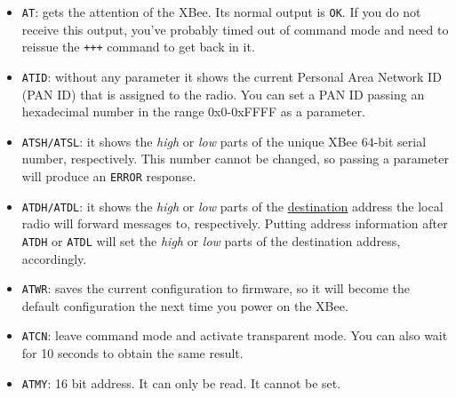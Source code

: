 \begin{itemize}
	\item \texttt{AT}: gets the attention of the XBee. Its normal output is \texttt{OK}. If you do not receive this output,  you've probably timed out of command mode and need to reissue the \texttt{+++} command to get back in it.
	\item \texttt{ATID}: without any parameter it shows the current Personal Area Network ID (PAN ID) that is assigned to the radio. You can set a PAN ID passing an hexadecimal number in the range $0$x$0$-$0$xFFFF as a parameter.
	\item \texttt{ATSH/ATSL}: it shows the \emph{high} or \emph{low} parts of the unique XBee $64$-bit serial number, respectively. This number cannot be changed, so passing a parameter will produce an \texttt{ERROR} response.
	\item \texttt{ATDH/ATDL}: it shows the \emph{high} or \emph{low} parts of the \underline{destination} address the local radio will forward messages to, respectively. Putting address information after \texttt{ATDH} or \texttt{ATDL} will set the \emph{high} or \emph{low} parts of the destination address, accordingly.
	\item \texttt{ATWR}: saves the current configuration to firmware, so it will become the default configuration the next time you power on the XBee.
    \item \texttt{ATCN}: leave command mode and activate transparent mode. You can also wait for 10 seconds to obtain the same result.
    \item \texttt{ATMY}: 16 bit address. It can only be read. It cannot be set.
\end{itemize}

		
